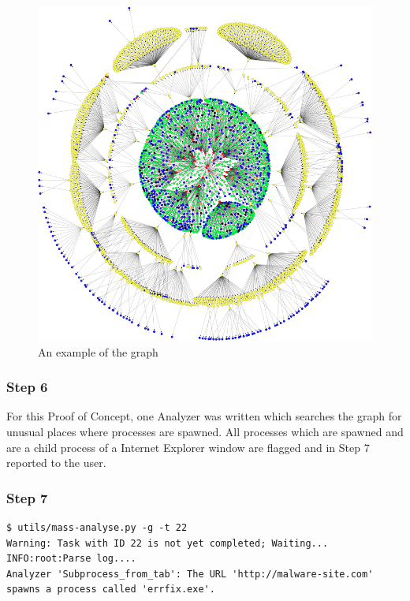 \begin{figure}[h]
    \centering
    \includegraphics[width=17cm]{Images/graph2.png}
    \caption{An example of the graph}
    \label{fig:alg_tree}
\end{figure}
\subsubsection{Step 6}

For this Proof of Concept, one Analyzer was written which searches the graph for unusual places where processes are spawned. All processes which are spawned and are a child process of a Internet Explorer window are flagged and in Step 7 reported to the user.


\subsubsection{Step 7}

\begin{lstlisting}
$ utils/mass-analyse.py -g -t 22
Warning: Task with ID 22 is not yet completed; Waiting...
INFO:root:Parse log....
Analyzer 'Subprocess_from_tab': The URL 'http://malware-site.com' 
spawns a process called 'errfix.exe'.
\end{lstlisting}

